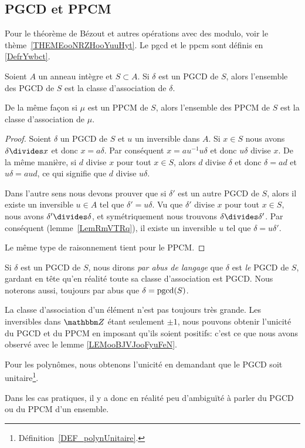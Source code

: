 \subsection{PGCD et PPCM}

Pour le théorème de Bézout et autres opérations avec des modulo, voir le thème~\ref{THEMEooNRZHooYuuHyt}. Le pgcd et le ppcm sont définis en \ref{DefrYwbct}.

\begin{lemma}
    Soient \( A\) un anneau intègre et \( S\subset A\). Si \( \delta\) est un PGCD de \( S\), alors l'ensemble des PGCD de \( S\) est la classe d'association de \( \delta\).

    De la même façon si \( \mu\) est un PPCM de \( S\), alors l'ensemble des PPCM de \( S\) est la classe d'association de \( \mu\).
\end{lemma}

\begin{proof}
    Soient \( \delta\) un PGCD de \( S\) et \( u\) un inversible dans \( A\). Si \( x\in S\) nous avons \( \delta\divides x\) et donc \( x=a\delta\). Par conséquent \( x=au^{-1}u\delta\) et donc \( u\delta\) divise \( x\). De la même manière, si \( d\) divise \( x\) pour tout \( x\in S\), alors \( d\) divise \( \delta\) et donc \( \delta=ad\) et \( u\delta=aud\), ce qui signifie que \( d\) divise \( u\delta\).

    Dans l'autre sens nous devons prouver que si \( \delta'\) est un autre PGCD de \( S\), alors il existe un inversible \( u\in A\) tel que \( \delta'=u\delta\). Vu que \( \delta'\) divise \( x\) pour tout \( x\in S\), nous avons \( \delta'\divides \delta\), et symétriquement nous trouvons \( \delta\divides\delta'\). Par conséquent (lemme~\ref{LemRmVTRq}), il existe un inversible \( u\) tel que \( \delta=u\delta'\).

    Le même type de raisonnement tient pour le PPCM.
\end{proof}

Si \( \delta\) est un PGCD de \( S\), nous dirons \emph{par abus de langage} que \( \delta\) est \emph{le} PGCD de \( S\), gardant en tête qu'en réalité toute sa classe d'association est PGCD. Nous noterons aussi, toujours par abus que \( \delta=\operatorname{pgcd}(S)\).

\begin{remark}
    La classe d'association d'un élément n'est pas toujours très grande. Les inversibles dans \( \eZ\) étant seulement \( \pm 1\), nous pouvons obtenir l'unicité du PGCD et du PPCM en imposant qu'ils soient positifs: c'est ce que nous avons observé avec le lemme \ref{LEMooBJVJooFyuFeN}.

    Pour les polynômes, nous obtenons l'unicité en demandant que le PGCD soit unitaire\footnote{Définition~\ref{DEF_polynUnitaire}.}.

    Dans les cas pratiques, il y a donc en réalité peu d'ambiguïté à parler du PGCD ou du PPCM d'un ensemble.
\end{remark}

